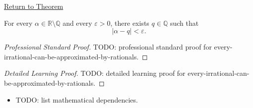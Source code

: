 \newpage
{}
\label{prf:every-irrational-can-be-approximated-by-rationals}

\begin{remark*}[Return]
\hyperref[cor:every-irrational-can-be-approximated-by-rationals]{Return to Theorem}
\end{remark*}

\begin{corollary*}
For every $\alpha\in\mathbb{R}\setminus\mathbb{Q}$ and every $\varepsilon>0$,
there exists $q\in\mathbb{Q}$ such that
\[
|\alpha-q|<\varepsilon.
\]
\end{corollary*}

\begin{proof}[Professional Standard Proof]
\LRAProofBodyStart
TODO: professional standard proof for every-irrational-can-be-approximated-by-rationals.
\end{proof}

\begin{proof}[Detailed Learning Proof]
\LRAProofBodyStart
TODO: detailed learning proof for every-irrational-can-be-approximated-by-rationals.
\end{proof}

\begin{remark*}
\end{remark*}

\begin{dependencies}
\begin{itemize}
  \item TODO: list mathematical dependencies.
\end{itemize}
\end{dependencies}

\clearpage
